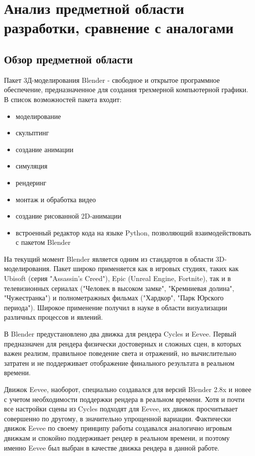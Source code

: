 \section{Анализ предметной области разработки, сравнение с аналогами
}

\subsection{Обзор предметной области}
Пакет 3Д-моделирования Blender - свободное и открытое программное обеспечение, предназначенное для создания трехмерной компьютерной графики. В список возможностей пакета входит:
\begin{itemize}
	\item моделирование
	\item скульптинг
	\item создание анимации
	\item симуляция
	\item рендеринг
	\item монтаж и обработка видео
	\item создание рисованной 2D-анимации
	\item встроенный редактор кода на языке Python, позволяющий взаимодействовать с пакетом Blender
\end{itemize}

На текущий момент Blender является одним из стандартов в области 3D-моделирования. Пакет широко применяется как в игровых студиях, таких как Ubisoft (серия "Assassin's Creed"), Epic (Unreal Engine, Fortnite), так и в телевизионных сериалах ("Человек в высоком замке", "Кремниевая долина", "Чужестранка") и полнометражных фильмах ("Хардкор", "Парк Юрского периода"). Широкое применение получил в науке в области визуализации различных процессов и явлений.

В Blender предустановлено два движка для рендера Cycles и Eevee. Первый предназначен для рендера физически достоверных и сложных сцен, в которых важен реализм, правильное поведение света и отражений, но вычислительно затратен и не поддерживает отображение финального результата в реальном времени.

Движок Eevee, наоборот, специально создавался для версий Blender 2.8x и новее с учетом необходимости поддержки рендера в реальном времени. Хотя и почти все настройки сцены из Cycles подходят для Eevee, их движок просчитывает совершенно по другому, в значительно упрощенной вариации. Фактически движок Eevee по своему принципу работы создавался аналогично игровым движкам и спокойно поддерживает рендер в реальном времени, и поэтому именно Eevee был выбран в качестве движка рендера в данной работе.

